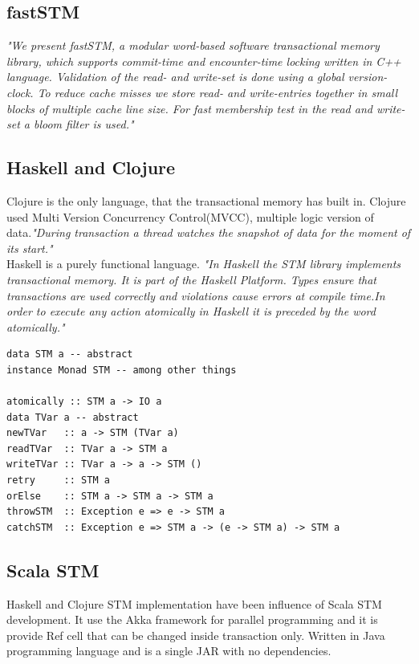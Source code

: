 \documentclass[12pt]{article}
\begin{document}
\subsection{fastSTM}
\textit{"We present fastSTM, a modular word-based software transactional memory library, which supports commit-time and encounter-time locking written in C++ language. Validation of the read- and write-set is done using a global version-clock. To reduce cache misses we store read- and write-entries together in small blocks of multiple cache line size. For fast membership test in the read and write-set a bloom filter is used."}\cite{Olivier}

\subsection{Haskell and Clojure}
Clojure is the only language, that the transactional memory has built in. Clojure used Multi Version Concurrency Control(MVCC), multiple logic version of data.\textit{"During transaction a thread watches the snapshot of data for the moment of its start."}\cite{JIghtuse}\\

Haskell is a purely functional language. \textit{"In Haskell the STM library implements transactional memory. It is part of the Haskell Platform. Types ensure that transactions are used correctly and violations cause errors at compile time.In order to execute any action atomically in Haskell it is preceded by the word atomically."}\cite{JIghtuse} 
\begin{lstlisting}
data STM a -- abstract
instance Monad STM -- among other things

atomically :: STM a -> IO a
data TVar a -- abstract
newTVar   :: a -> STM (TVar a)
readTVar  :: TVar a -> STM a
writeTVar :: TVar a -> a -> STM ()
retry     :: STM a
orElse    :: STM a -> STM a -> STM a
throwSTM  :: Exception e => e -> STM a
catchSTM  :: Exception e => STM a -> (e -> STM a) -> STM a
\end{lstlisting}
\subsection{Scala STM}
Haskell and Clojure STM implementation have been influence of Scala STM development. It use the Akka framework for parallel programming and it is provide Ref cell that can be changed inside transaction only.\cite{JIghtuse} 
Written in Java programming language and is a single JAR with no dependencies.\\
\end{document}
